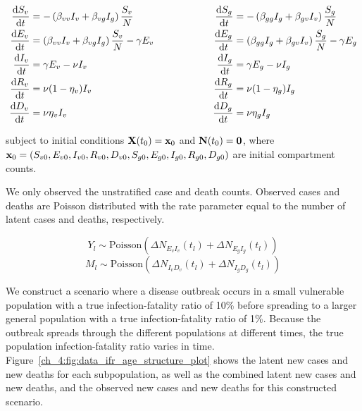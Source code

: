 \begin{equation}
\label{ch_4:eqn:model_hetero_SIR_ODEs}
\begin{aligned}
\frac{\mathrm{d} S_v}{\mathrm{d} t} &= -\left(\beta_{vv} I_v + \beta_{vg} I_g \right) \frac{S_v}{N} \\
\frac{\mathrm{d} E_v}{\mathrm{d} t} &= \left(\beta_{vv} I_v + \beta_{vg} I_g \right) \frac{S_v}{N} - \gamma E_v \\
\frac{\mathrm{d} I_v}{\mathrm{d} t} &= \gamma E_v - \nu I_v \\
\frac{\mathrm{d} R_v}{\mathrm{d} t} &= \nu (1-\eta_v) I_v \\
\frac{\mathrm{d} D_v}{\mathrm{d} t} &= \nu \eta_v I_v \\
\end{aligned}
\qquad \qquad \qquad
\begin{aligned}
\frac{\mathrm{d} S_g}{\mathrm{d} t} &= -\left(\beta_{gg} I_g + \beta_{gv} I_v\right) \frac{S_g}{N} \\
\frac{\mathrm{d} E_g}{\mathrm{d} t} &= \left(\beta_{gg} I_g + \beta_{gv} I_v \right) \frac{S_g}{N} - \gamma E_g \\
\frac{\mathrm{d} I_g}{\mathrm{d} t} &= \gamma E_g - \nu I_g \\
\frac{\mathrm{d} R_g}{\mathrm{d} t} &= \nu (1-\eta_g) I_g \\
\frac{\mathrm{d} D_g}{\mathrm{d} t} &= \nu \eta_g I_g \\
\end{aligned}
\end{equation}

subject to initial conditions $ \mathbf{X}(t_0) = \mathbf{x}_0 $ and $ \mathbf{N}(t_0) = \mathbf{0}$, where $\bx_0 = (S_{v0}, E_{v0}, I_{v0}, R_{v0}, \linebreak[0] D_{v0}, S_{g0}, E_{g0}, I_{g0}, R_{g0}, D_{g0})$ are initial compartment counts.

We only observed the unstratified case and death counts.
Observed cases and deaths are Poisson distributed with the rate parameter equal to the number of latent cases and deaths, respectively.

\[ Y_l \sim \text{Poisson}(\Delta N_{E_v I_v}(t_l) + \Delta N_{E_g I_g}(t_l)) \]
\[ M_l \sim \text{Poisson}(\Delta N_{I_v D_v}(t_l) + \Delta N_{I_g D_g}(t_l)) \]

We construct a scenario where a disease outbreak occurs in a small vulnerable population with a true infection-fatality ratio of 10\% before spreading to a larger general population with a true infection-fatality ratio of 1\%.
Because the outbreak spreads through the different populations at different times, the true population infection-fatality ratio varies in time.
Figure~\ref{ch_4:fig:data_ifr_age_structure_plot} shows the latent new cases and new deaths for each subpopulation, as well as the combined latent new cases and new deaths, and the observed new cases and new deaths for this constructed scenario.

